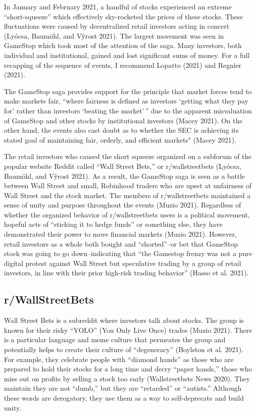 \documentclass[12pt,]{article}
\begin{document}
In January and February 2021, a handful of stocks experienced an extreme
``short-squeeze'' which effectively sky-rocketed the prices of these
stocks. These fluctuations were caused by decentralized retail investors
acting in concert (Lyócsa, Baumöhl, and Vŷrost 2021). The largest
movement was seen in GameStop which took most of the attention of the
saga. Many investors, both individual and institutional, gained and lost
significant sums of money. For a full recapping of the sequence of
events, I recommend Lopatto (2021) and Regnier (2021).

The GameStop saga provides support for the principle that market forces
tend to make markets fair, ``where fairness is defined as investors
`getting what they pay for' rather than investors `beating the
market'\,'' due to the apparent misvaluation of GameStop and other
stocks by institutional investors (Macey 2021). On the other hand, the
events also cast doubt as to whether the SEC is achieving its stated
goal of maintaining fair, orderly, and efficient markets" (Macey 2021).

The retail investors who caused the short squeeze organized on a
subforum of the popular website Reddit called ``Wall Street Bets,'' or
r/wallstreetbets (Lyócsa, Baumöhl, and Vŷrost 2021). As a result, the
GameStop saga is seen as a battle between Wall Street and small,
Robinhood traders who are upset at unfairness of Wall Street and the
stock market. The members of r/wallstreetbets maintained a sense of
unity and purpose throughout the events (Muzio 2021). Regardless of
whether the organized behavior of r/wallstreetbets users is a political
movement, hopeful acts of ``sticking it to hedge funds'' or something
else, they have demonstrated their power to move financial markets
(Muzio 2021). However, retail investors as a whole both bought and
``shorted''--or bet that GameStop stock was going to go down--indicating
that ``the Gamestop frenzy was not a pure digital protest against Wall
Street but speculative trading by a group of retail investors, in line
with their prior high-risk trading behavior'' (Hasso et al. 2021).

\hypertarget{rwallstreetbets}{%
\subsection{r/WallStreetBets}\label{rwallstreetbets}}

Wall Street Bets is a subreddit where investors talk about stocks. The
group is known for their risky ``YOLO'' (You Only Live Once) trades
(Muzio 2021). There is a particular language and meme culture that
permeates the group and potentially helps to create their culture of
``degeneracy'' (Boylston et al. 2021). For example, they celebrate
people with ``diamond hands'' as those who are prepared to hold their
stocks for a long time and decry ``paper hands,'' those who miss out on
profits by selling a stock too early (Wallstreetbets News 2020). They
maintain they are not ``dumb,'' but they are ``retarded'' or
``autists.'' Although these words are derogatory, they use them as a way
to self-deprecate and build unity.
\end{document}
